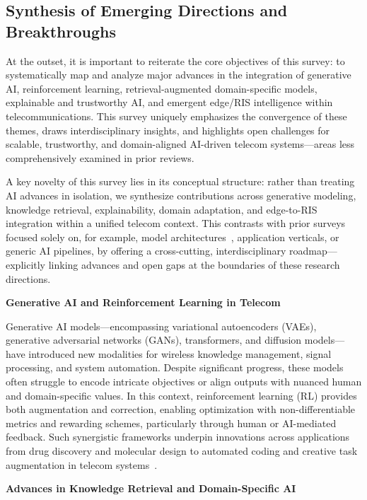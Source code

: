 \documentclass[sigconf]{acmart}
\begin{document}
\subsection{Synthesis of Emerging Directions and Breakthroughs}

At the outset, it is important to reiterate the core objectives of this survey: to systematically map and analyze major advances in the integration of generative AI, reinforcement learning, retrieval-augmented domain-specific models, explainable and trustworthy AI, and emergent edge/RIS intelligence within telecommunications. This survey uniquely emphasizes the convergence of these themes, draws interdisciplinary insights, and highlights open challenges for scalable, trustworthy, and domain-aligned AI-driven telecom systems—areas less comprehensively examined in prior reviews.

A key novelty of this survey lies in its conceptual structure: rather than treating AI advances in isolation, we synthesize contributions across generative modeling, knowledge retrieval, explainability, domain adaptation, and edge-to-RIS integration within a unified telecom context. This contrasts with prior surveys focused solely on, for example, model architectures~\cite{ref44}, application verticals, or generic AI pipelines, by offering a cross-cutting, interdisciplinary roadmap—explicitly linking advances and open gaps at the boundaries of these research directions.

\textbf{Generative AI and Reinforcement Learning in Telecom}

Generative AI models—encompassing variational autoencoders (VAEs), generative adversarial networks (GANs), transformers, and diffusion models—have introduced new modalities for wireless knowledge management, signal processing, and system automation. Despite significant progress, these models often struggle to encode intricate objectives or align outputs with nuanced human and domain-specific values. In this context, reinforcement learning (RL) provides both augmentation and correction, enabling optimization with non-differentiable metrics and rewarding schemes, particularly through human or AI-mediated feedback. Such synergistic frameworks underpin innovations across applications from drug discovery and molecular design to automated coding and creative task augmentation in telecom systems~\cite{ref1, ref2, ref3, ref4, ref5, ref6}.

\textbf{Advances in Knowledge Retrieval and Domain-Specific AI}
\end{document}
